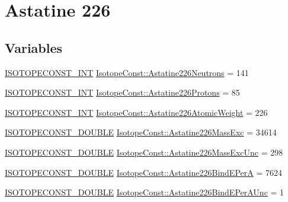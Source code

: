 \hypertarget{group___isotope_const-_astatine-_at226}{}\section{Astatine 226}
\label{group___isotope_const-_astatine-_at226}
\subsection*{Variables}
\begin{DoxyCompactItemize}
\item 
\mbox{\hyperlink{group___isotope_const-_macros_ga5f18360b3e99483a35c32d789e62621c}{I\+S\+O\+T\+O\+P\+E\+C\+O\+N\+S\+T\+\_\+\+I\+NT}} \mbox{\hyperlink{group___isotope_const-_astatine-_at226_ga7b0196190027821d768f58197f18217b}{Isotope\+Const\+::\+Astatine226\+Neutrons}} = 141
\item 
\mbox{\hyperlink{group___isotope_const-_macros_ga5f18360b3e99483a35c32d789e62621c}{I\+S\+O\+T\+O\+P\+E\+C\+O\+N\+S\+T\+\_\+\+I\+NT}} \mbox{\hyperlink{group___isotope_const-_astatine-_at226_gabe68e98ce5dc09f771412e1dc4392d17}{Isotope\+Const\+::\+Astatine226\+Protons}} = 85
\item 
\mbox{\hyperlink{group___isotope_const-_macros_ga5f18360b3e99483a35c32d789e62621c}{I\+S\+O\+T\+O\+P\+E\+C\+O\+N\+S\+T\+\_\+\+I\+NT}} \mbox{\hyperlink{group___isotope_const-_astatine-_at226_ga66a31dfb9da7f67f9e76b2f1312ede6a}{Isotope\+Const\+::\+Astatine226\+Atomic\+Weight}} = 226
\item 
\mbox{\hyperlink{group___isotope_const-_macros_ga8f45a7272ce02c0b4c65c44636ed719a}{I\+S\+O\+T\+O\+P\+E\+C\+O\+N\+S\+T\+\_\+\+D\+O\+U\+B\+LE}} \mbox{\hyperlink{group___isotope_const-_astatine-_at226_gaaa01e26e1b977d2ffd86784ab02437e7}{Isotope\+Const\+::\+Astatine226\+Mass\+Exc}} = 34614
\item 
\mbox{\hyperlink{group___isotope_const-_macros_ga8f45a7272ce02c0b4c65c44636ed719a}{I\+S\+O\+T\+O\+P\+E\+C\+O\+N\+S\+T\+\_\+\+D\+O\+U\+B\+LE}} \mbox{\hyperlink{group___isotope_const-_astatine-_at226_ga8d37e64f13a09a72d6da30175a0723ee}{Isotope\+Const\+::\+Astatine226\+Mass\+Exc\+Unc}} = 298
\item 
\mbox{\hyperlink{group___isotope_const-_macros_ga8f45a7272ce02c0b4c65c44636ed719a}{I\+S\+O\+T\+O\+P\+E\+C\+O\+N\+S\+T\+\_\+\+D\+O\+U\+B\+LE}} \mbox{\hyperlink{group___isotope_const-_astatine-_at226_ga840a57c19a67c86d686dc88a0ab35abf}{Isotope\+Const\+::\+Astatine226\+Bind\+E\+PerA}} = 7624
\item 
\mbox{\hyperlink{group___isotope_const-_macros_ga8f45a7272ce02c0b4c65c44636ed719a}{I\+S\+O\+T\+O\+P\+E\+C\+O\+N\+S\+T\+\_\+\+D\+O\+U\+B\+LE}} \mbox{\hyperlink{group___isotope_const-_astatine-_at226_gabd91a13a96196a02988194d0368d75d8}{Isotope\+Const\+::\+Astatine226\+Bind\+E\+Per\+A\+Unc}} = 1

\end{DoxyCompactItemize}

